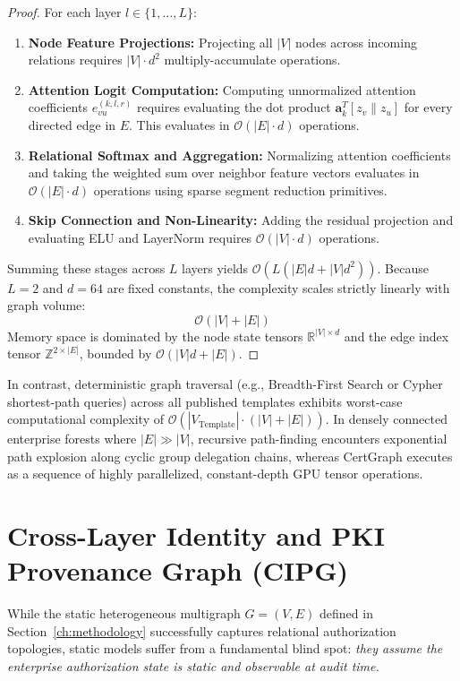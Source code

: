 \begin{proof}
For each layer $l \in \{1, \dots, L\}$:
\begin{enumerate}
    \item \textbf{Node Feature Projections:} Projecting all $|V|$ nodes across incoming relations requires $|V| \cdot d^2$ multiply-accumulate operations.
    \item \textbf{Attention Logit Computation:} Computing unnormalized attention coefficients $e_{vu}^{(k, l, r)}$ requires evaluating the dot product $\mathbf{a}_k^T [z_v \| z_u]$ for every directed edge in $E$. This evaluates in $\mathcal{O}(|E| \cdot d)$ operations.
    \item \textbf{Relational Softmax and Aggregation:} Normalizing attention coefficients and taking the weighted sum over neighbor feature vectors evaluates in $\mathcal{O}(|E| \cdot d)$ operations using sparse segment reduction primitives.
    \item \textbf{Skip Connection and Non-Linearity:} Adding the residual projection and evaluating ELU and LayerNorm requires $\mathcal{O}(|V| \cdot d)$ operations.
\end{enumerate}
Summing these stages across $L$ layers yields $\mathcal{O}(L (|E| d + |V| d^2))$. Because $L = 2$ and $d = 64$ are fixed constants, the complexity scales strictly linearly with graph volume:
\begin{equation}
\mathcal{O}(|V| + |E|)
\end{equation}
Memory space is dominated by the node state tensors $\mathbb{R}^{|V| \times d}$ and the edge index tensor $\mathbb{Z}^{2 \times |E|}$, bounded by $\mathcal{O}(|V| d + |E|)$.
\end{proof}

In contrast, deterministic graph traversal (e.g., Breadth-First Search or Cypher shortest-path queries) across all published templates exhibits worst-case computational complexity of $\mathcal{O}(|V_{\text{Template}}| \cdot (|V| + |E|))$. In densely connected enterprise forests where $|E| \gg |V|$, recursive path-finding encounters exponential path explosion along cyclic group delegation chains, whereas CertGraph executes as a sequence of highly parallelized, constant-depth GPU tensor operations.

\section{Cross-Layer Identity and PKI Provenance Graph (CIPG)}
\label{sec:cipg_methodology}
While the static heterogeneous multigraph $G = (V, E)$ defined in Section~\ref{ch:methodology} successfully captures relational authorization topologies, static models suffer from a fundamental blind spot: \textit{they assume the enterprise authorization state is static and observable at audit time.} 

